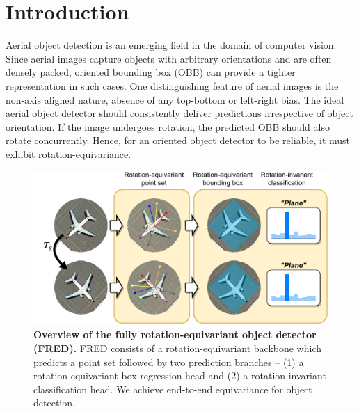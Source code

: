 \documentclass[letterpaper]{article} %
\begin{document}
\section{Introduction}
Aerial object detection is an emerging field in the domain of computer vision. Since aerial images capture objects with arbitrary orientations and are often densely packed, oriented bounding box (OBB) can provide a tighter representation in such cases. One distinguishing feature of aerial images is the non-axis aligned nature, absence of any top-bottom or left-right bias. The ideal aerial object detector should consistently deliver predictions irrespective of object orientation. If the image undergoes rotation, the predicted OBB should also rotate concurrently. Hence, for an oriented object detector to be reliable, it must exhibit rotation-equivariance.
\begin{figure}[t]
\centering
\includegraphics[width=\linewidth]{figs/figure1-v3.pdf}
\caption{\textbf{Overview of the fully rotation-equivariant object detector (FRED).} FRED consists of a rotation-equivariant backbone which predicts a point set followed by two prediction branches -- (1) a rotation-equivariant box regression head and (2) a rotation-invariant classification head. We achieve end-to-end equivariance for object detection.} 
\label{fig:figure1}
\end{figure}
\end{document}
